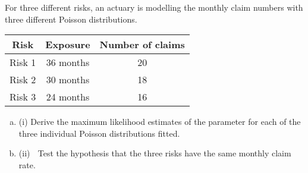 \documentclass[a4paper,12pt]{article}
\begin{document}
For three different risks, an actuary is modelling the monthly claim numbers with
three different Poisson distributions.
\begin{center}
\begin{tabular}{|c|c|c|}
Risk & Exposure & Number of claims \\ \hline
Risk 1 & 36 months & 20 \\ \hline
Risk 2 & 30 months & 18\\ \hline
Risk 3 & 24 months & 16\\ \hline
\end{tabular}
\end{center}
\begin{enumerate}[(a)]
\item (i) Derive the maximum likelihood estimates of the parameter for each of the
three individual Poisson distributions fitted.

\item (ii)
 Test the hypothesis that the three risks have the same monthly claim rate. 
\end{enumerate}
\end{document}
